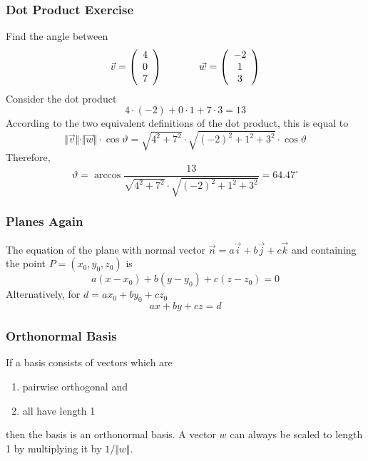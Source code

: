 \documentclass[xcolor=dvipsnames]{beamer}
\begin{document}
\begin{frame}
  \frametitle{Dot Product Exercise}
  {\ubung} Find the angle between
  \begin{equation}
    \label{eq:tauhohju}
    \vec{v}=\left(
      \begin{array}{c}
        4 \\
        0 \\
        7
      \end{array}\right)\hspace{.5in}\vec{w}=\left(
      \begin{array}{c}
        -2 \\
        1 \\
        3
      \end{array}\right)
  \end{equation}
  Consider the dot product
  \begin{equation}
    \label{eq:ijaquahd}
    4\cdot(-2)+0\cdot{}1+7\cdot{}3=13
  \end{equation}
According to the two equivalent definitions of the dot product, this
is equal to
\begin{equation}
  \label{eq:ohyizaeb}
  \Vert\vec{v}\Vert\cdot\Vert\vec{w}\Vert\cdot\cos\vartheta=\sqrt{4^{2}+7^{2}}\cdot\sqrt{(-2)^{2}+1^{2}+3^{2}}\cdot\cos\vartheta
\end{equation}
Therefore,
\begin{equation}
  \label{eq:yohsheen}
  \vartheta=\arccos\frac{13}{\sqrt{4^{2}+7^{2}}\cdot\sqrt{(-2)^{2}+1^{2}+3^{2}}}=64.47^{\circ}
\end{equation}
\end{frame}

\begin{frame}
  \frametitle{Planes Again}
  The equation of the plane with normal vector
  $\vec{n}=a\vec{i}+b\vec{j}+c\vec{k}$ and containing the point
  $P=(x_{0},y_{0},z_{0})$ is
  \begin{equation}
    \label{eq:ijaeriri}
    a(x-x_{0})+b(y-y_{0})+c(z-z_{0})=0
  \end{equation}
  Alternatively, for $d=ax_{0}+by_{0}+cz_{0}$
  \begin{equation}
    \label{eq:bamoyeez}
    ax+by+cz=d
  \end{equation}
\end{frame}

\begin{frame}
  \frametitle{Orthonormal Basis}
  If a basis consists of vectors which are
  \begin{enumerate}
  \item pairwise orthogonal and
  \item all have length 1
  \end{enumerate}
  then the basis is an \alert{orthonormal basis}. A vector $w$ can always
  be scaled to length 1 by multiplying it by $1/\Vert{}w\Vert$. 
\end{frame}
\end{document}

